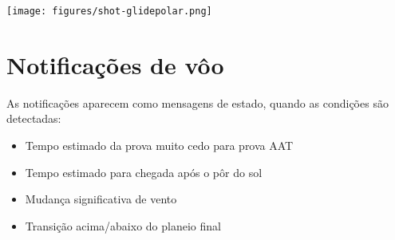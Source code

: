\begin{center}
\texttt{[image: figures/shot-glidepolar.png]}
\end{center}


\section{Notificações de vôo}

As notificações aparecem como mensagens de estado, quando as condições são detectadas:
\begin{itemize}
\item Tempo estimado da prova muito cedo para prova AAT
\item Tempo estimado para chegada após o pôr do sol
\item Mudança significativa de vento
\item Transição acima/abaixo do planeio final 
\end{itemize}
